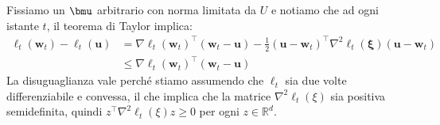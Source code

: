 \documentclass[\main/main.tex]{subfiles}
\begin{document}
\begin{analysis}
    Fissiamo un \(\bmu\) arbitrario con norma limitata da \(U\) e notiamo che ad ogni istante \(t\), il teorema di Taylor implica:
    \begin{align*}
        \ell_{t}\left(\boldsymbol{w}_{t}\right)-\ell_{t}(\boldsymbol{u})&=\nabla \ell_{t}\left(\boldsymbol{w}_{t}\right)^{\top}\left(\boldsymbol{w}_{t}-\boldsymbol{u}\right)-\frac{1}{2}\left(\boldsymbol{u}-\boldsymbol{w}_{t}\right)^{\top} \nabla^{2} \ell_{t}(\boldsymbol{\xi})\left(\boldsymbol{u}-\boldsymbol{w}_{t}\right)\\&\leq \nabla \ell_{t}\left(\boldsymbol{w}_{t}\right)^{\top}\left(\boldsymbol{w}_{t}-\boldsymbol{u}\right)
    \end{align*}
    La disuguaglianza vale perché stiamo assumendo che \(\ell_t\) sia due volte differenziabile e convessa, il che implica che la matrice \(\nabla^{2} \ell_{t}(\xi)\) sia positiva semidefinita, quindi \(z^{\top} \nabla^{2} \ell_{t}(\xi) z \geq 0\) per ogni \(z \in \mathbb{R}^{d}\).
    

\end{analysis}
\end{document}
